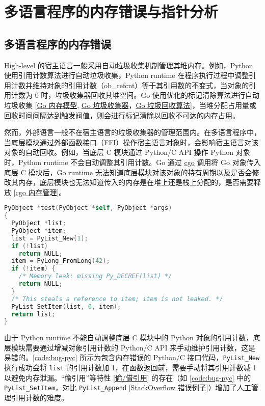 \newpage

\section{多语言程序的内存错误与指针分析}

\subsection{多语言程序的内存错误}
\label{sec:membug}

High-level 的宿主语言一般采用自动垃圾收集机制管理其堆内存。例如，Python 使用引用计数算法进行自动垃圾收集，Python runtime 在程序执行过程中调整引用计数并维持对象的引用计数（ob\_refcnt）等于其引用数的不变式，当对象的引用计数为 0 时，垃圾收集器回收其堆空间。Go 使用优化的标记清除算法进行自动垃圾收集 [\href{https://zhuanlan.zhihu.com/p/76802887}{Go 内存模型}, \href{https://tip.golang.org/doc/gc-guide}{Go 垃圾收集器}，\href{https://zhuanlan.zhihu.com/p/390926887}{Go 垃圾回收算法}]，当堆分配占用量或回收时间间隔达到触发阀值，则会进行标记清除以回收不可达的内存占用。

然而，外部语言一般不在宿主语言的垃圾收集器的管理范围内。在多语言程序中，当底层模块通过外部函数接口（FFI）操作宿主语言对象时，会影响宿主语言对该对象的自动回收。例如，当底层 C 模块通过 Python/C API 操作 Python 对象时，Python runtime 不会自动调整其引用计数。Go 通过 \href{https://golang.google.cn/cmd/cgo/}{cgo} 调用将 Go 对象传入底层 C 模块后，Go runtime 无法知道底层模块对该对象的持有周期以及是否会修改其内存，底层模块也无法知道传入的内存是在堆上还是栈上分配的，是否需要释放 [\href{https://www.pengrl.com/p/29054/}{cgo 内存管理}]。

\begin{lstfloat}
\begin{lstlisting}[language={C},caption={错误的 Python/C 接口程序},label={code:bug-pyc}]
PyObject *test(PyObject *self, PyObject *args)
{
  PyObject *list;
  PyObject *item;
  list = PyList_New(1);
  if (!list)
    return NULL;
  item = PyLong_FromLong(42);
  if (!item) {
    /* Memory leak: missing Py_DECREF(list) */
    return NULL;
  }
  /* This steals a reference to item; item is not leaked. */
  PyList_SetItem(list, 0, item);
  return list;
}
\end{lstlisting}
\end{lstfloat}

由于 Python runtime 不能自动调整底层 C 模块中的 Python 对象的引用计数，底层模块需要通过增减对象引用计数的 Python/C API 来手动维护引用计数，这是易错的。\autoref{code:bug-pyc} 所示为包含内存错误的 Python/C 接口代码，\texttt{PyList\_New} 执行成功会将 \texttt{list} 的引用计数加 1，在函数返回前，需要手动将其引用计数减 1 以避免内存泄漏。“偷引用”等特性 [\href{https://docs.python.org/3/c-api/intro.html#reference-count-details}{偷/借引用}] 的存在（如 \autoref{code:bug-pyc} 中的 \texttt{PyList\_SetItem}，对比 \texttt{PyList\_Append} [\href{https://stackoverflow.com/questions/57143041/memory-leak-in-c-extension-for-python}{StackOverflow 错误例子}]）增加了人工管理引用计数的难度。

